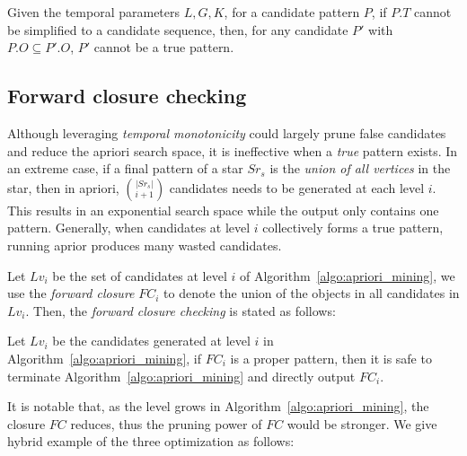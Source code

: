 \begin{theorem}
\label{THM:SPM_TM}
Given the temporal parameters $L,G,K$, for a candidate pattern $P$,
if $P.T$ cannot be simplified to a candidate sequence,
then, for any candidate $P'$ with $P.O \subseteq P'.O$, $P'$ cannot be a true pattern.
\end{theorem}


\subsection{Forward closure checking}
Although leveraging \emph{temporal monotonicity} could largely prune
false candidates and reduce the apriori search space, 
it is ineffective when a \textit{true} pattern exists. 
In an extreme case, if a final pattern of a star $Sr_s$ is 
the \textit{union of all vertices} in the star,
then in apriori, ${|Sr_s|}\choose{i + 1}$ candidates needs to be generated at 
each level $i$. This results in an exponential search space while
the output only contains one pattern.  
Generally, when candidates at level $i$ collectively forms a true pattern, 
running aprior produces many wasted candidates. 

Let $Lv_i$ be the set of candidates at level $i$ of Algorithm~\ref{algo:apriori_mining},
we use the \emph{forward closure} $FC_i$ to denote the union of the objects in
all candidates in $Lv_i$. Then, the \emph{forward closure checking} is stated as follows:
\begin{theorem}
\label{THM:SPM_FCC}
Let $Lv_i$ be the candidates generated at level $i$ in Algorithm~\ref{algo:apriori_mining},
if $FC_i$ is a proper pattern, then it is safe to terminate Algorithm~\ref{algo:apriori_mining}
and directly output $FC_i$.
\end{theorem}


It is notable that, as the level grows in Algorithm~\ref{algo:apriori_mining}, the closure $FC$
reduces, thus the pruning power of $FC$ would be stronger. We give hybrid example of the three
optimization as follows:
%

